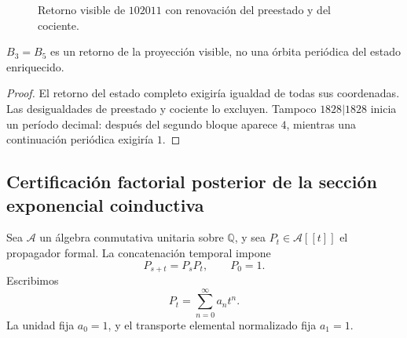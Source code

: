 \begin{figure}[htbp]
\centering
{}
\caption{Retorno visible de \(102011\) con renovación del preestado y del
cociente.}
\label{p12-83-c9-s2:fig:ruptura-memoria-e}
\end{figure}

\begin{theorem}
\label{p12-83-c9-s2:thm:retorno-visible-no-periodico-e}
\(B_3=B_5\) es un retorno de la proyección visible, no una órbita periódica
del estado enriquecido.
\end{theorem}

\begin{proof}
El retorno del estado completo exigiría igualdad de todas sus coordenadas.
Las desigualdades de preestado y cociente lo excluyen. Tampoco
\(1828|1828\) inicia un período decimal: después del segundo bloque aparece
\(4\), mientras una continuación periódica exigiría \(1\).
\end{proof}

\subsection{Certificación factorial posterior de la sección exponencial coinductiva}

Sea \(\mathcal A\) un álgebra conmutativa unitaria sobre \(\mathbb Q\), y
sea \(P_t\in\mathcal A[[t]]\) el propagador formal. La concatenación
temporal impone
\[
 P_{s+t}=P_sP_t,
 \qquad
 P_0=1.
\]
Escribimos
\[
 P_t=\sum_{n=0}^{\infty}a_nt^n.
\]
La unidad fija \(a_0=1\), y el transporte elemental normalizado fija
\(a_1=1\).

